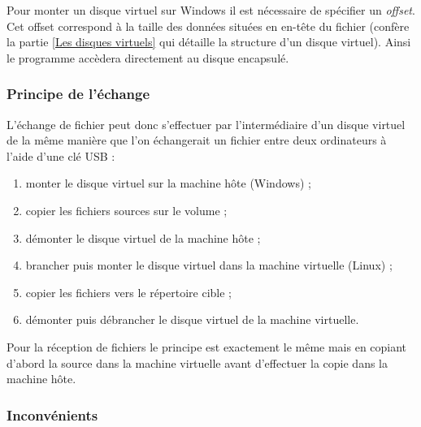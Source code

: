 Pour monter un disque virtuel sur Windows il est nécessaire de spécifier un \textit{offset}.
Cet offset correspond à la taille des données situées en en-tête du fichier (confère la partie \ref{Les disques virtuels} qui détaille la structure d'un disque virtuel).
Ainsi le programme accèdera directement au disque encapsulé. 
\\




\subsubsection{Principe de l'échange}

L'échange de fichier peut donc s'effectuer par l'intermédiaire d'un disque virtuel de la même manière que l'on échangerait un fichier entre deux ordinateurs à l'aide d'une clé USB :
\begin{enumerate}
	\item monter le disque virtuel sur la machine hôte (Windows) ;
	\item copier les fichiers sources sur le volume ;
	\item démonter le disque virtuel de la machine hôte ;
	\item brancher puis monter le disque virtuel dans la machine virtuelle (Linux) ;
	\item copier les fichiers vers le répertoire cible ;
	\item démonter puis débrancher le disque virtuel de la machine virtuelle.
\end{enumerate}
Pour la réception de fichiers le principe est exactement le même mais en copiant d'abord la source dans la machine virtuelle avant d'effectuer la copie dans la machine hôte.
\\




\subsubsection{Inconvénients}
\label{Inconvénients de l'échange par disque virtuel}

